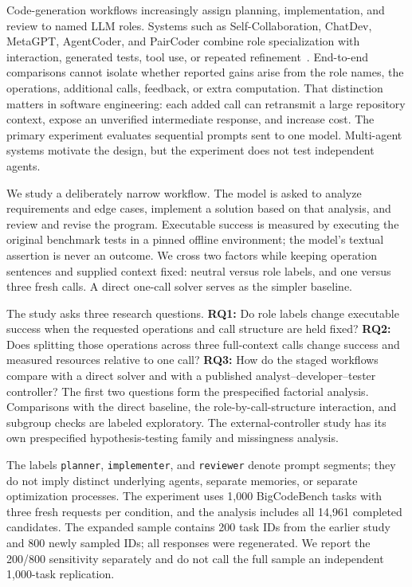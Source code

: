 \documentclass[pdflatex,sn-nature]{scientificreports}
\begin{document}
Code-generation workflows increasingly assign planning, implementation, and review to named LLM roles. Systems such as Self-Collaboration, ChatDev, MetaGPT, AgentCoder, and PairCoder combine role specialization with interaction, generated tests, tool use, or repeated refinement~\cite{dong2023selfcollaboration,qian2024chatdev,hong2024metagpt,huang2023agentcoder,zhang2024paircoder}. End-to-end comparisons cannot isolate whether reported gains arise from the role names, the operations, additional calls, feedback, or extra computation. That distinction matters in software engineering: each added call can retransmit a large repository context, expose an unverified intermediate response, and increase cost. The primary experiment evaluates sequential prompts sent to one model. Multi-agent systems motivate the design, but the experiment does not test independent agents.

We study a deliberately narrow workflow. The model is asked to analyze requirements and edge cases, implement a solution based on that analysis, and review and revise the program. Executable success is measured by executing the original benchmark tests in a pinned offline environment; the model's textual assertion is never an outcome. We cross two factors while keeping operation sentences and supplied context fixed: neutral versus role labels, and one versus three fresh calls. A direct one-call solver serves as the simpler baseline.

The study asks three research questions. \textbf{RQ1:} Do role labels change executable success when the requested operations and call structure are held fixed? \textbf{RQ2:} Does splitting those operations across three full-context calls change success and measured resources relative to one call? \textbf{RQ3:} How do the staged workflows compare with a direct solver and with a published analyst--developer--tester controller? The first two questions form the prespecified factorial analysis. Comparisons with the direct baseline, the role-by-call-structure interaction, and subgroup checks are labeled exploratory. The external-controller study has its own prespecified hypothesis-testing family and missingness analysis.

The labels \texttt{planner}, \texttt{implementer}, and \texttt{reviewer} denote prompt segments; they do not imply distinct underlying agents, separate memories, or separate optimization processes. The experiment uses 1,000 BigCodeBench tasks with three fresh requests per condition, and the analysis includes all 14,961 completed candidates. The expanded sample contains 200 task IDs from the earlier study and 800 newly sampled IDs; all responses were regenerated. We report the 200/800 sensitivity separately and do not call the full sample an independent 1,000-task replication.
\end{document}
